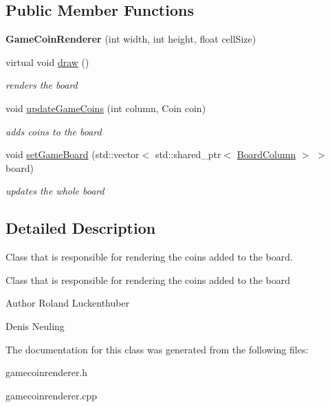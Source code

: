 \subsection*{\-Public \-Member \-Functions}
\begin{DoxyCompactItemize}
\item 
\hypertarget{classGameCoinRenderer_a74dd1dd742641b6585df5fe24d4c4e62}{{\bfseries \-Game\-Coin\-Renderer} (int width, int height, float cell\-Size)}\label{classGameCoinRenderer_a74dd1dd742641b6585df5fe24d4c4e62}

\item 
\hypertarget{classGameCoinRenderer_a2b1b51d93a38675ee1f30fc6cacbaccd}{virtual void \hyperlink{classGameCoinRenderer_a2b1b51d93a38675ee1f30fc6cacbaccd}{draw} ()}\label{classGameCoinRenderer_a2b1b51d93a38675ee1f30fc6cacbaccd}

\begin{DoxyCompactList}\small\item\em renders the board \end{DoxyCompactList}\item 
\hypertarget{classGameCoinRenderer_a88ecbeec05a81381ee676463fe2aac53}{void \hyperlink{classGameCoinRenderer_a88ecbeec05a81381ee676463fe2aac53}{update\-Game\-Coins} (int column, \-Coin coin)}\label{classGameCoinRenderer_a88ecbeec05a81381ee676463fe2aac53}

\begin{DoxyCompactList}\small\item\em adds coins to the board \end{DoxyCompactList}\item 
\hypertarget{classGameCoinRenderer_a20a3e2499f4f1656a3e1012ef34e7e89}{void \hyperlink{classGameCoinRenderer_a20a3e2499f4f1656a3e1012ef34e7e89}{set\-Game\-Board} (std\-::vector$<$ std\-::shared\-\_\-ptr$<$ \hyperlink{classBoardColumn}{\-Board\-Column} $>$ $>$ board)}\label{classGameCoinRenderer_a20a3e2499f4f1656a3e1012ef34e7e89}

\begin{DoxyCompactList}\small\item\em updates the whole board \end{DoxyCompactList}\end{DoxyCompactItemize}


\subsection{\-Detailed \-Description}
\-Class that is responsible for rendering the coins added to the board. 

\-Class that is responsible for rendering the coins added to the board

\begin{DoxyAuthor}{\-Author}
\-Roland \-Luckenthuber 

\-Denis \-Neuling 
\end{DoxyAuthor}


\-The documentation for this class was generated from the following files\-:\begin{DoxyCompactItemize}
\item 
gamecoinrenderer.\-h\item 
gamecoinrenderer.\-cpp\end{DoxyCompactItemize}
